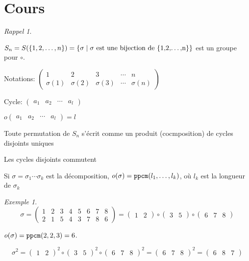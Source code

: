 \documentclass{report}
\newcounter{cours}
\newcommand*{\cours}{\section*{Cours \thecours}\stepcounter{cours}}
\theoremstyle{definition}
\theoremstyle{remark}
\newtheorem*{exem}{Exemple}
\newtheorem*{rappel}{Rappel}
\begin{document}
	\cours
	\begin{rappel}
		~

		\begin{ulist}
			\item $S_n = S(\{1,2,\dots,n\}) = \{\sigma \mid \sigma \text{ est une bijection de \{1,2,\dots,n\}}\}$ est un groupe pour $\circ$.
			\item Notations: $\begin{pmatrix}
				1&2&3&\dotsb&n\\
				\sigma(1)&\sigma(2)&\sigma(3)&\dotsb&\sigma(n)
			\end{pmatrix}$

			Cycle: $\begin{pmatrix}
				a_1&a_2&\dotsb&a_l
			\end{pmatrix}$
			\item $o\begin{pmatrix}
				a_1&a_2&\dotsb&a_l
			\end{pmatrix} = l$
			\item Toute permutation de $S_n$ s'\'ecrit comme un produit (cocmposition) de cycles disjoints uniques
			\item Les cycles disjoints commutent
			\item Si $\sigma = \sigma_1 \dotsb \sigma_k$ est la d\'ecomposition, $o(\sigma) = \verb|ppcm|(l_1, \dots, l_k)$, o\`u $l_k$ est la longueur de $\sigma_k$
		\end{ulist}
	\end{rappel}
	\begin{exem}
		\[
		\sigma = \begin{pmatrix}
			1&2&3&4&5&6&7&8\\
			2&1&5&4&3&7&8&6
		\end{pmatrix} = \begin{pmatrix}
			1&2
		\end{pmatrix} \circ \begin{pmatrix}
			3&5
		\end{pmatrix} \circ \begin{pmatrix}
			6&7&8
		\end{pmatrix}
		\]

		$o(\sigma) = \verb|ppcm|(2,2,3) = 6$.

		\[
		\sigma^2 = \begin{pmatrix}
			1&2
		\end{pmatrix}^2 \circ \begin{pmatrix}
			3&5
		\end{pmatrix}^2 \circ \begin{pmatrix}
			6&7&8
		\end{pmatrix}^2 = \begin{pmatrix}
			6&7&8
		\end{pmatrix}^2 = \begin{pmatrix}
			6&8&7
		\end{pmatrix}
		\]
	\end{exem}
\end{document}
